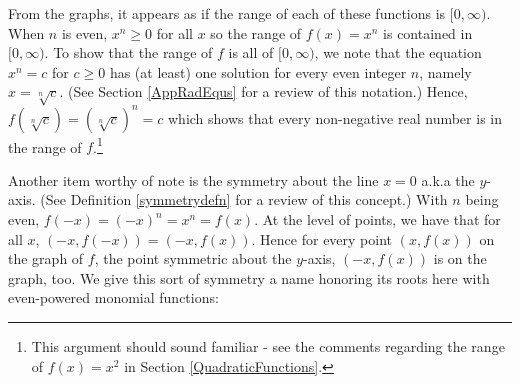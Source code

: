 \documentclass{ximera}
\begin{document}











From the graphs, it appears as if the range of each of these functions is $[0, \infty)$.  When $n$ is even, $x^n \geq 0$ for all $x$ so the range of $f(x) = x^{n}$ is contained in $[0, \infty)$.  To show that the range of $f$ is all of $[0, \infty)$, we note that the equation $x^n  = c$ for $c \geq 0$ has (at least) one solution for every even integer $n$, namely  $x = \sqrt[n]{c}$. (See Section \ref{AppRadEqus} for a review of this notation.)  Hence, $f(\sqrt[n]{c}) = (\sqrt[n]{c})^n = c$ which shows that every non-negative real number is in the range of $f$.\footnote{This argument should sound familiar - see the comments regarding the range of $f(x) = x^2$ in Section \ref{QuadraticFunctions}.}


Another item worthy of note is the symmetry about the line $x =0$ a.k.a the $y$-axis. (See Definition \ref{symmetrydefn} for a review of this concept.) With $n$ being even, $f(-x) = (-x)^n = x^n = f(x)$. At the level of points, we have that for all $x$, $(-x, f(-x)) = (-x,f(x))$.  Hence for every point $(x, f(x))$ on the graph of $f$,  the point symmetric about the $y$-axis, $(-x, f(x))$ is on the graph, too.  We give this sort of symmetry a name honoring its roots here with even-powered monomial functions:
\end{document}
